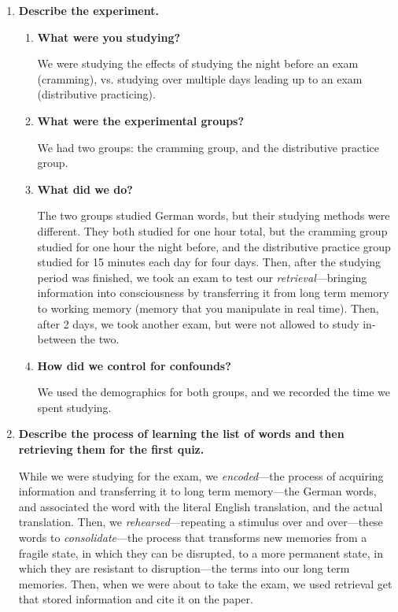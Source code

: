 \documentclass[stu,12pt,floatsintext]{apa7}
\begin{document}
\begin{enumerate}
    \item \textbf{Describe the experiment.}
    \begin{enumerate}
        \item \textbf{What were you studying?}

        We were studying the effects of studying the night before an exam (cramming), vs. studying over multiple days leading up to an exam (distributive practicing).
        
        \item \textbf{What were the experimental groups?}

        We had two groups: the cramming group, and the distributive practice group.

        \item \textbf{What did we do?}
        
        The two groups studied German words, but their studying methods were different. They both studied for one hour total, but the cramming group studied for one hour the night before, and the distributive practice group studied for 15 minutes each day for four days. Then, after the studying period was finished, we took an exam to test our \textit{retrieval}---bringing information into consciousness by transferring it from long term memory to working memory (memory that you manipulate in real time). Then, after 2 days, we took another exam, but were not allowed to study in-between the two.

        \item \textbf{How did we control for confounds?}
        
        We used the demographics for both groups, and we recorded the time we spent studying. 

    \end{enumerate}  
    \item \textbf{Describe the process of learning the list of words and then retrieving them for the first quiz.}

    While we were studying for the exam, we \textit{encoded}---the process of acquiring information and transferring it to long term memory---the German words, and associated the word with the literal English translation, and the actual translation. Then, we \textit{rehearsed}---repeating a stimulus over and over---these words to \textit{consolidate}---the process that transforms new memories from a fragile state, in which they can be disrupted, to a more permanent state, in which they are resistant to disruption---the terms into our long term memories. Then, when we were about to take the exam, we used retrieval get that stored information and cite it on the paper. 


\end{enumerate}
\end{document}
